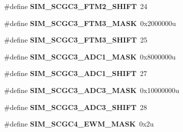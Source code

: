 \begin{DoxyCompactItemize}
\item 
\hypertarget{group___s_i_m___register___masks_gaa31635b220d66ac1a6f8f59b3d64cc6e}{}\#define {\bfseries S\+I\+M\+\_\+\+S\+C\+G\+C3\+\_\+\+F\+T\+M2\+\_\+\+S\+H\+I\+F\+T}~24\label{group___s_i_m___register___masks_gaa31635b220d66ac1a6f8f59b3d64cc6e}

\item 
\hypertarget{group___s_i_m___register___masks_ga5e148c582c15e4caa9bf69c5229562ec}{}\#define {\bfseries S\+I\+M\+\_\+\+S\+C\+G\+C3\+\_\+\+F\+T\+M3\+\_\+\+M\+A\+S\+K}~0x2000000u\label{group___s_i_m___register___masks_ga5e148c582c15e4caa9bf69c5229562ec}

\item 
\hypertarget{group___s_i_m___register___masks_gaf6e5e9833e8a4ff9b18aabe19b7e625b}{}\#define {\bfseries S\+I\+M\+\_\+\+S\+C\+G\+C3\+\_\+\+F\+T\+M3\+\_\+\+S\+H\+I\+F\+T}~25\label{group___s_i_m___register___masks_gaf6e5e9833e8a4ff9b18aabe19b7e625b}

\item 
\hypertarget{group___s_i_m___register___masks_gaf26716d3c8b3d13168bbb2c879e69db1}{}\#define {\bfseries S\+I\+M\+\_\+\+S\+C\+G\+C3\+\_\+\+A\+D\+C1\+\_\+\+M\+A\+S\+K}~0x8000000u\label{group___s_i_m___register___masks_gaf26716d3c8b3d13168bbb2c879e69db1}

\item 
\hypertarget{group___s_i_m___register___masks_ga45dd1ca87c734edcbe3b47feee134746}{}\#define {\bfseries S\+I\+M\+\_\+\+S\+C\+G\+C3\+\_\+\+A\+D\+C1\+\_\+\+S\+H\+I\+F\+T}~27\label{group___s_i_m___register___masks_ga45dd1ca87c734edcbe3b47feee134746}

\item 
\hypertarget{group___s_i_m___register___masks_ga130d28798db5f573b28113e49f2b97f2}{}\#define {\bfseries S\+I\+M\+\_\+\+S\+C\+G\+C3\+\_\+\+A\+D\+C3\+\_\+\+M\+A\+S\+K}~0x10000000u\label{group___s_i_m___register___masks_ga130d28798db5f573b28113e49f2b97f2}

\item 
\hypertarget{group___s_i_m___register___masks_ga0523896620e3fc9dc975c95f0ccd9bfa}{}\#define {\bfseries S\+I\+M\+\_\+\+S\+C\+G\+C3\+\_\+\+A\+D\+C3\+\_\+\+S\+H\+I\+F\+T}~28\label{group___s_i_m___register___masks_ga0523896620e3fc9dc975c95f0ccd9bfa}

\item 
\hypertarget{group___s_i_m___register___masks_ga374818f52beee72a9bafcb9efd573dbb}{}\#define {\bfseries S\+I\+M\+\_\+\+S\+C\+G\+C4\+\_\+\+E\+W\+M\+\_\+\+M\+A\+S\+K}~0x2u\label{group___s_i_m___register___masks_ga374818f52beee72a9bafcb9efd573dbb}


\end{DoxyCompactItemize}
